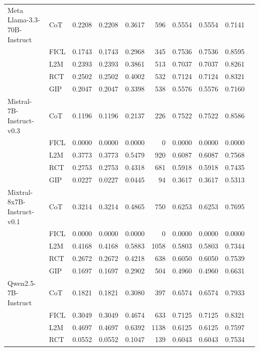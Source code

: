 \documentclass[conference]{IEEEtran}
\begin{document}
\begin{longtable}{p{3.5cm} l r r r r r r r r}
Meta Llama-3.3-70B-Instruct & CoT  & 0.2208 & 0.2208 & 0.3617 & 596 & 0.5554 & 0.5554 & 0.7141 \\
                            & FICL & 0.1743 & 0.1743 & 0.2968 & 345 & 0.7536 & 0.7536 & 0.8595 \\
                            & L2M  & 0.2393 & 0.2393 & 0.3861 & 513 & 0.7037 & 0.7037 & 0.8261 \\
                            & RCT  & 0.2502 & 0.2502 & 0.4002 & 532 & 0.7124 & 0.7124 & 0.8321 \\
                            & GIP  & 0.2047 & 0.2047 & 0.3398 & 538 & 0.5576 & 0.5576 & 0.7160 \\ \addlinespace
Mistral-7B-Instruct-v0.3 & CoT  & 0.1196 & 0.1196 & 0.2137 & 226 & 0.7522 & 0.7522 & 0.8586 \\
                         & FICL & 0.0000 & 0.0000 & 0.0000 & 0 & 0.0000 & 0.0000 & 0.0000 \\
                         & L2M  & 0.3773 & 0.3773 & 0.5479 & 920 & 0.6087 & 0.6087 & 0.7568 \\
                         & RCT  & 0.2753 & 0.2753 & 0.4318 & 681 & 0.5918 & 0.5918 & 0.7435 \\
                         & GIP  & 0.0227 & 0.0227 & 0.0445 & 94 & 0.3617 & 0.3617 & 0.5313 \\ \addlinespace
Mixtral-8x7B-Instruct-v0.1 & CoT  & 0.3214 & 0.3214 & 0.4865 & 750 & 0.6253 & 0.6253 & 0.7695 \\
                           & FICL & 0.0000 & 0.0000 & 0.0000 & 0 & 0.0000 & 0.0000 & 0.0000 \\
                           & L2M  & 0.4168 & 0.4168 & 0.5883 & 1058 & 0.5803 & 0.5803 & 0.7344 \\
                           & RCT  & 0.2672 & 0.2672 & 0.4218 & 638 & 0.6050 & 0.6050 & 0.7539 \\
                           & GIP  & 0.1697 & 0.1697 & 0.2902 & 504 & 0.4960 & 0.4960 & 0.6631 \\ \addlinespace
Qwen2.5-7B-Instruct & CoT  & 0.1821 & 0.1821 & 0.3080 & 397 & 0.6574 & 0.6574 & 0.7933 \\
                    & FICL & 0.3049 & 0.3049 & 0.4674 & 633 & 0.7125 & 0.7125 & 0.8321 \\
                    & L2M  & 0.4697 & 0.4697 & 0.6392 & 1138 & 0.6125 & 0.6125 & 0.7597 \\
                    & RCT  & 0.0552 & 0.0552 & 0.1047 & 139 & 0.6043 & 0.6043 & 0.7534 \\

\end{longtable}
\end{document}
